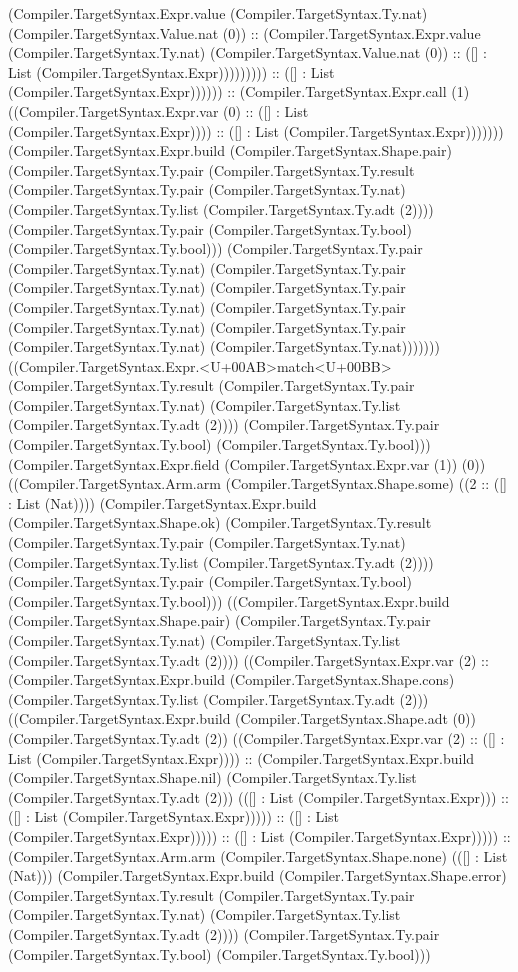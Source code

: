 \documentclass[11pt]{article}
\begin{document}
(Compiler.TargetSyntax.Expr.value (Compiler.TargetSyntax.Ty.nat) (Compiler.TargetSyntax.Value.nat (0)) :: (Compiler.TargetSyntax.Expr.value (Compiler.TargetSyntax.Ty.nat) (Compiler.TargetSyntax.Value.nat (0)) :: ([] : List (Compiler.TargetSyntax.Expr))))))))) :: ([] : List (Compiler.TargetSyntax.Expr)))))) :: (Compiler.TargetSyntax.Expr.call (1) ((Compiler.TargetSyntax.Expr.var (0) :: ([] : List (Compiler.TargetSyntax.Expr)))) :: ([] : List (Compiler.TargetSyntax.Expr))))))) (Compiler.TargetSyntax.Expr.build (Compiler.TargetSyntax.Shape.pair) (Compiler.TargetSyntax.Ty.pair (Compiler.TargetSyntax.Ty.result (Compiler.TargetSyntax.Ty.pair (Compiler.TargetSyntax.Ty.nat) (Compiler.TargetSyntax.Ty.list (Compiler.TargetSyntax.Ty.adt (2)))) (Compiler.TargetSyntax.Ty.pair (Compiler.TargetSyntax.Ty.bool) (Compiler.TargetSyntax.Ty.bool))) (Compiler.TargetSyntax.Ty.pair (Compiler.TargetSyntax.Ty.nat) (Compiler.TargetSyntax.Ty.pair (Compiler.TargetSyntax.Ty.nat) (Compiler.TargetSyntax.Ty.pair (Compiler.TargetSyntax.Ty.nat) (Compiler.TargetSyntax.Ty.pair (Compiler.TargetSyntax.Ty.nat) (Compiler.TargetSyntax.Ty.pair (Compiler.TargetSyntax.Ty.nat) (Compiler.TargetSyntax.Ty.nat))))))) ((Compiler.TargetSyntax.Expr.<U+00AB>match<U+00BB> (Compiler.TargetSyntax.Ty.result (Compiler.TargetSyntax.Ty.pair (Compiler.TargetSyntax.Ty.nat) (Compiler.TargetSyntax.Ty.list (Compiler.TargetSyntax.Ty.adt (2)))) (Compiler.TargetSyntax.Ty.pair (Compiler.TargetSyntax.Ty.bool) (Compiler.TargetSyntax.Ty.bool))) (Compiler.TargetSyntax.Expr.field (Compiler.TargetSyntax.Expr.var (1)) (0)) ((Compiler.TargetSyntax.Arm.arm (Compiler.TargetSyntax.Shape.some) ((2 :: ([] : List (Nat)))) (Compiler.TargetSyntax.Expr.build (Compiler.TargetSyntax.Shape.ok) (Compiler.TargetSyntax.Ty.result (Compiler.TargetSyntax.Ty.pair (Compiler.TargetSyntax.Ty.nat) (Compiler.TargetSyntax.Ty.list (Compiler.TargetSyntax.Ty.adt (2)))) (Compiler.TargetSyntax.Ty.pair (Compiler.TargetSyntax.Ty.bool) (Compiler.TargetSyntax.Ty.bool))) ((Compiler.TargetSyntax.Expr.build (Compiler.TargetSyntax.Shape.pair) (Compiler.TargetSyntax.Ty.pair (Compiler.TargetSyntax.Ty.nat) (Compiler.TargetSyntax.Ty.list (Compiler.TargetSyntax.Ty.adt (2)))) ((Compiler.TargetSyntax.Expr.var (2) :: (Compiler.TargetSyntax.Expr.build (Compiler.TargetSyntax.Shape.cons) (Compiler.TargetSyntax.Ty.list (Compiler.TargetSyntax.Ty.adt (2))) ((Compiler.TargetSyntax.Expr.build (Compiler.TargetSyntax.Shape.adt (0)) (Compiler.TargetSyntax.Ty.adt (2)) ((Compiler.TargetSyntax.Expr.var (2) :: ([] : List (Compiler.TargetSyntax.Expr)))) :: (Compiler.TargetSyntax.Expr.build (Compiler.TargetSyntax.Shape.nil) (Compiler.TargetSyntax.Ty.list (Compiler.TargetSyntax.Ty.adt (2))) (([] : List (Compiler.TargetSyntax.Expr))) :: ([] : List (Compiler.TargetSyntax.Expr))))) :: ([] : List (Compiler.TargetSyntax.Expr))))) :: ([] : List (Compiler.TargetSyntax.Expr))))) :: (Compiler.TargetSyntax.Arm.arm (Compiler.TargetSyntax.Shape.none) (([] : List (Nat))) (Compiler.TargetSyntax.Expr.build (Compiler.TargetSyntax.Shape.error) (Compiler.TargetSyntax.Ty.result (Compiler.TargetSyntax.Ty.pair (Compiler.TargetSyntax.Ty.nat) (Compiler.TargetSyntax.Ty.list (Compiler.TargetSyntax.Ty.adt (2)))) (Compiler.TargetSyntax.Ty.pair (Compiler.TargetSyntax.Ty.bool) (Compiler.TargetSyntax.Ty.bool))) 
\end{document}
